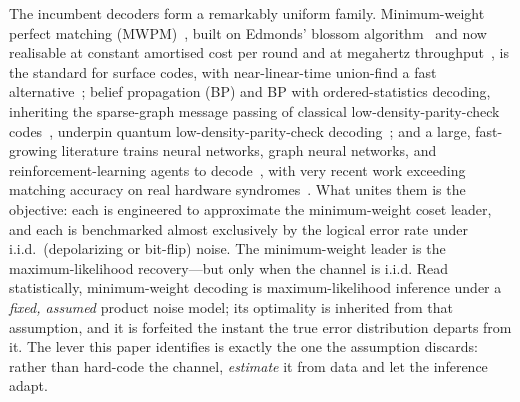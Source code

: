 \documentclass[reprint,aps,prxquantum,amsmath,amssymb,floatfix,nofootinbib,longbibliography]{revtex4-2}
\theoremstyle{definition}
\theoremstyle{remark}
\theoremstyle{plain}
\begin{document}
The incumbent decoders form a remarkably uniform family. Minimum-weight perfect matching (MWPM)~\cite{dennis2002topological,fowler2012surface,higgott2022pymatching}, built on Edmonds' blossom algorithm~\cite{edmonds1965paths} and now realisable at constant amortised cost per round and at megahertz throughput~\cite{fowler2013minimum,higgott2025sparse}, is the standard for surface codes, with near-linear-time union-find a fast alternative~\cite{delfosse2021almost}; belief propagation (BP) and BP with ordered-statistics decoding, inheriting the sparse-graph message passing of classical low-density-parity-check codes~\cite{mackay1999good}, underpin quantum low-density-parity-check decoding~\cite{poulin2008iterative,panteleev2021degenerate,roffe2020decoding}; and a large, fast-growing literature trains neural networks, graph neural networks, and reinforcement-learning agents to decode~\cite{torlai2017neural,varsamopoulos2017decoding,baireuther2018machine,krastanov2017deep,sweke2020reinforcement,andreasson2019quantum,lange2025data}, with very recent work exceeding matching accuracy on real hardware syndromes~\cite{bausch2024learning}. What unites them is the objective: each is engineered to approximate the minimum-weight coset leader, and each is benchmarked almost exclusively by the logical error rate under i.i.d.\ (depolarizing or bit-flip) noise. The minimum-weight leader is the maximum-likelihood recovery---but only when the channel is i.i.d. Read statistically, minimum-weight decoding is maximum-likelihood inference under a \emph{fixed, assumed} product noise model; its optimality is inherited from that assumption, and it is forfeited the instant the true error distribution departs from it. The lever this paper identifies is exactly the one the assumption discards: rather than hard-code the channel, \emph{estimate} it from data and let the inference adapt.
\end{document}
